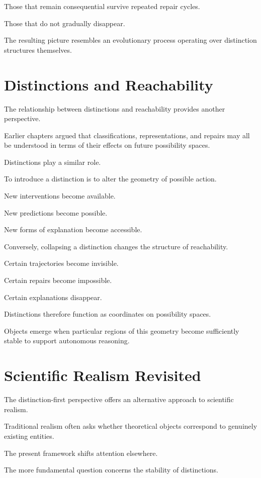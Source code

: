 \documentclass[11pt,oneside,openany]{book}
\begin{document}
Those that remain consequential survive repeated repair cycles.

Those that do not gradually disappear.

The resulting picture resembles an evolutionary process operating over distinction structures themselves.

\section{Distinctions and Reachability}

The relationship between distinctions and reachability provides another perspective.

Earlier chapters argued that classifications, representations, and repairs may all be understood in terms of their effects on future possibility spaces.

Distinctions play a similar role.

To introduce a distinction is to alter the geometry of possible action.

New interventions become available.

New predictions become possible.

New forms of explanation become accessible.

Conversely, collapsing a distinction changes the structure of reachability.

Certain trajectories become invisible.

Certain repairs become impossible.

Certain explanations disappear.

Distinctions therefore function as coordinates on possibility spaces.

Objects emerge when particular regions of this geometry become sufficiently stable to support autonomous reasoning.

\section{Scientific Realism Revisited}

The distinction-first perspective offers an alternative approach to scientific realism.

Traditional realism often asks whether theoretical objects correspond to genuinely existing entities.

The present framework shifts attention elsewhere.

The more fundamental question concerns the stability of distinctions.
\end{document}
